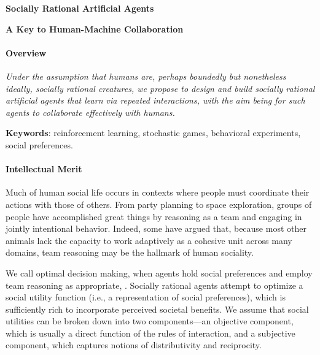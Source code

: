 
\centerline{\Large \bf Socially Rational Artificial Agents}

\vspace{\down}
\centerline{\large \bf A Key to Human-Machine Collaboration}

\vspace{\up}
\paragraph{Overview}

\emph{Under the assumption that humans are, perhaps boundedly
  but nonetheless ideally, socially rational creatures, we propose to
  design and build socially rational artificial agents that learn via
  repeated interactions, with the aim being for such agents to
  collaborate effectively with humans.}



{\bf Keywords}: reinforcement learning, stochastic games, behavioral experiments, social preferences.

\vspace{\up}
\paragraph{Intellectual Merit}

Much of human social life occurs in contexts where people must
coordinate their actions with those of others.  From party planning to
space exploration,
groups of people have
accomplished great things by reasoning as a team and engaging in
jointly intentional behavior.  Indeed, some have argued that, because
most other animals lack the capacity to work adaptively as a cohesive
unit across many domains, team reasoning may be the hallmark of human
sociality.

We call optimal decision making, when agents hold social preferences
and employ team reasoning as appropriate, .  
Socially
rational agents attempt to optimize a social utility function (i.e., a
representation of social preferences), which is sufficiently rich to
incorporate perceived societal
benefits.  We assume that social utilities can be broken down into two
components---an objective component, which is usually a direct
function of the rules of interaction, and a subjective component,
which captures notions of distributivity and reciprocity.

